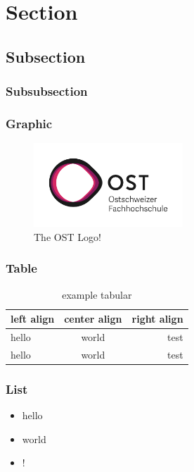 \section{Section}

\subsection{Subsection}


\subsubsection{Subsubsection}
\lipsum[1]

\subsubsection{Graphic}
\begin{figure}[h]
    \centering
    \includegraphics[width=0.5\textwidth]{images/ost}
    \caption{The OST Logo!}\label{fig:figure}
\end{figure}

\newpage

\subsubsection{Table}
\begin{table}[h]
    \centering
    \caption{example tabular}
    \label{tab:example tabular}
    \begin{tabular}{l c r}
        \bfseries{left align} & \bfseries{center align} & \bfseries{right align}\\ \hline
        hello & world & test\\
        hello & world & test\\
    \end{tabular}
\end{table}

\subsubsection{List}
\begin{itemize}
    \item hello
    \item world
    \item !
\end{itemize}

